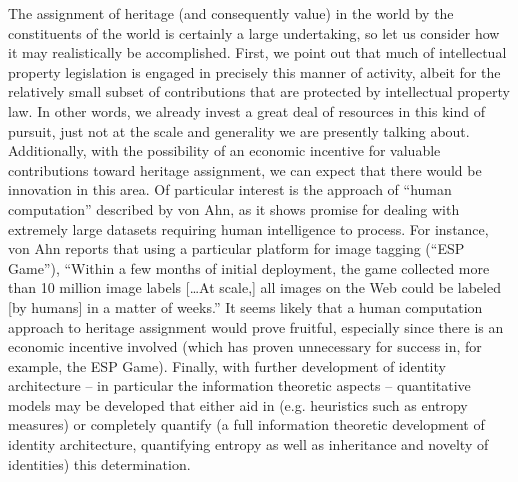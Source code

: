 \documentclass[pra,twocolumn,groupedaddress,10pt]{revtex4}
\theoremstyle{definition}
\begin{document}
The assignment of heritage (and consequently value) in the world by the constituents of the world is certainly a large undertaking, so let us consider how it may realistically be accomplished. First, we point out that much of intellectual property legislation is engaged in precisely this manner of activity, albeit for the relatively small subset of contributions that are protected by intellectual property law. In other words, we already invest a great deal of resources in this kind of pursuit, just not at the scale and generality we are presently talking about. Additionally, with the possibility of an economic incentive for valuable contributions toward heritage assignment, we can expect that there would be innovation in this area. Of particular interest is the approach of ``human computation'' described by von Ahn\cite{vonahn}, as it shows promise for dealing with extremely large datasets requiring human intelligence to process. For instance, von Ahn reports that using a particular platform for image tagging (``ESP Game''), ``Within a few months of initial deployment, the game collected more than 10 million image labels [\ldots At scale,] all images on the Web could be labeled [by humans] in a matter of weeks.'' It seems likely that a human computation approach to heritage assignment would prove fruitful, especially since there is an economic incentive involved (which has proven unnecessary for success in, for example, the ESP Game). Finally, with further development of identity architecture -- in particular the information theoretic aspects -- quantitative models may be developed that either aid in (e.g. heuristics such as entropy measures) or completely quantify (a full information theoretic development of identity architecture, quantifying entropy as well as inheritance and novelty of identities) this determination.
\end{document}
